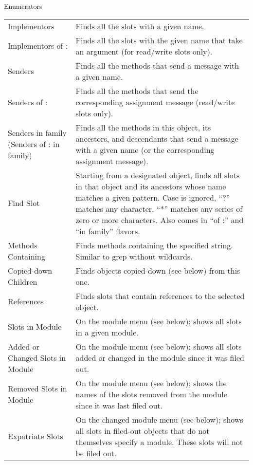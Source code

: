 \documentclass[letterpaper,10pt,english]{sphinxmanual}
\begin{document}
\begin{threeparttable}
\capstart\caption{Enumerators}\label{\detokenize{howtoprg:id17}}
\noindent\begin{tabulary}{\linewidth}{|L|L|}
\hline
{}\relax &\relax \\
\hline
Implementors
&
Finds all the slots with a given name.
\\
\hline
Implementors of :
&
Finds all the slots with the given name that take an argument (for read/write slots only).
\\
\hline
Senders
&
Finds all the methods that send a message with a given name.
\\
\hline
Senders of :
&
Finds all the methods that send the corresponding assignment message (read/write slots only).
\\
\hline
Senders in family (Senders of : in family)
&
Finds all the methods in this object, its ancestors, and descendants that send a message with a given name (or the corresponding assignment message).
\\
\hline
Find Slot
&
Starting from a designated object, finds all slots in that object and its ancestors whose name matches a given pattern. Case is ignored, “?” matches any character, “*” matches any series of zero or more characters. Also comes in “of :” and “in family” flavors.
\\
\hline
Methods Containing
&
Finds methods containing the specified string. Similar to grep without wildcards.
\\
\hline
Copied-down Children
&
Finds objects copied-down (see below) from this one.
\\
\hline
References
&
Finds slots that contain references to the selected object.
\\
\hline
Slots in Module
&
On the module menu (see below); shows all slots in a given module.
\\
\hline
Added or Changed Slots in Module
&
On the module menu (see below); shows all slots added or changed in the module since it was filed out.
\\
\hline
Removed Slots in Module
&
On the module menu (see below); shows the names of the slots removed from the module since it was last filed out.
\\
\hline
Expatriate Slots
&
On the changed module menu (see below); shows all slots in filed-out objects that do not themselves specify a module. These slots will not be filed out.
\\
\hline\end{tabulary}

\end{threeparttable}
\end{document}
